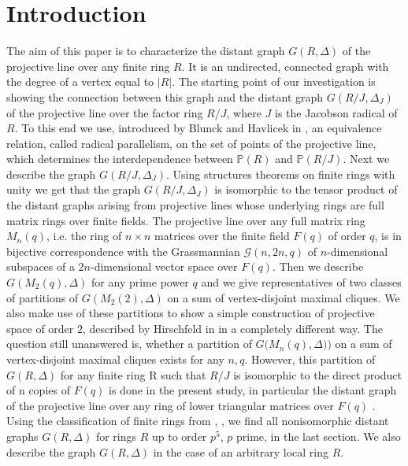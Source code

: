 \documentclass[12pt,a4paper]{article}
\theoremstyle{definition}
\begin{document}
\section{Introduction}
The aim of this paper is to characterize the distant graph $G(R, \Delta)$ of the projective line over any finite ring $R$. It is an undirected, connected graph with the degree of a vertex equal to $|R|$.\newline 
The starting point of our investigation is showing the connection between this graph and the distant graph $G(R/J, \Delta_J)$ of the projective line over the factor ring $R/J$, where $J$ is the Jacobson radical of $R$. To this end we use, introduced by Blunck and Havlicek in \cite{radical}, an equivalence relation, called radical parallelism, on the set of points of the projective line, which determines the interdependence between $\mathbb{P}(R)$ and $\mathbb{P}(R/J)$. Next we describe the graph $G(R/J, \Delta_J)$. Using structures theorems \cite{behrens} on finite rings with unity we get that the graph $G(R/J, \Delta_J)$ is isomorphic to the tensor product of the distant graphs arising from projective lines whose underlying rings are full matrix rings over finite fields. The projective line over any full matrix ring $M_n(q)$, i.e. the ring of $n\times n$ matrices over the finite field $F(q)$ of order $q$, is in bijective correspondence with the Grassmannian $\mathscr G(n,2n,q)$ of $n$-dimensional subspaces of a $2n$-dimensional vector  space over $F(q)$. Then we describe $G(M_2(q), \Delta)$ for any prime power $q$ and we give representatives of two classes of partitions of $G(M_2(2), \Delta)$  on a sum of vertex-disjoint maximal cliques. We also make use of these partitions to show a simple construction of projective space of order $2$, described by Hirschfeld in \cite{hir} in a completely different way. The question still unanswered is, whether a partition of $G\big(M_n(q), \Delta)\big)$ on a sum of vertex-disjoint maximal cliques exists for any $n, q$. However, this partition of $G(R, \Delta)$ for any finite ring R such that $R/J$ is isomorphic to the
direct product of n copies of $F(q)$ is done in the present study, in particular the distant graph of the projective line over any ring of lower triangular matrices over $F(q)$ .\newline
Using the classification of finite rings from \cite{p4}, \cite{p5}, we find all nonisomorphic distant graphs $G(R, \Delta)$ for rings $R$ up to order $p^5$, $p$ prime, in the last section. We also describe the graph $G(R, \Delta)$ in the case of an arbitrary local ring $R$.
\end{document}
